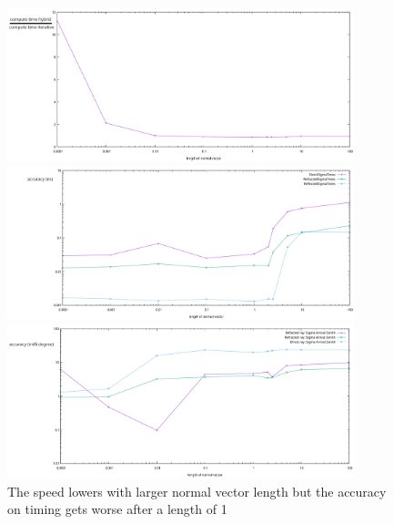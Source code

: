 \begin{figure}
	\centering
	\begin{minipage}{\textwidth}
		\includegraphics[width=0.9\textwidth]{figures/NormVsTime.pdf}
	\end{minipage}
	\begin{minipage}{\textwidth}
		\includegraphics[width=0.9\textwidth]{figures/NormVsSigmaTime.pdf}
	\end{minipage}
	\begin{minipage}{\textwidth}
		\includegraphics[width=0.9\textwidth]{figures/NormVsSigmaAZ.pdf}
	\end{minipage}
\caption{The speed lowers with larger normal vector length but the accuracy on timing gets worse after a length of 1}
\label{fig:norminfl}
\end{figure}

